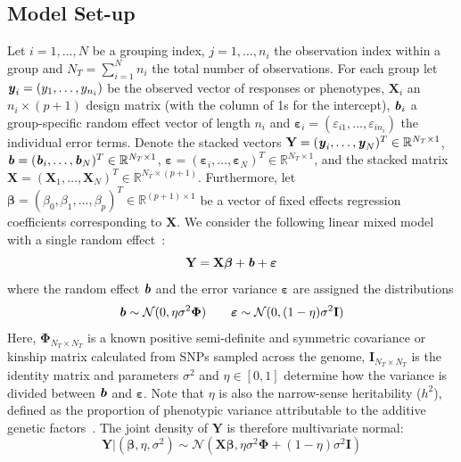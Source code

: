\documentclass[12pt,letter]{article}\usepackage[]{graphicx}\usepackage[]{color}
\newcommand{\by}{\textbf{\emph{y}}}
\newcommand{\bX}{\textbf{X}}
\newcommand{\bY}{\textbf{Y}}
\newcommand{\bb}{\textbf{\emph{b}}}
\newcommand{\bI}{\textbf{I}}
\newcommand{\be}{\boldsymbol{\varepsilon}}
\newcommand{\bbeta}{\boldsymbol{\beta}}
\newcommand{\bPhi}{\boldsymbol{\Phi}}
\begin{document}



\subsection{Model Set-up}

Let $i = 1, \ldots, N$ be a grouping index, $j = 1, \ldots, n_i$ the observation index within a group and $N_T = \sum_{i=1}^{N} n_i$ the total number of observations. For each group let \mbox{$\by_i = (y_1, \ldots, y_{n_i})$} be the observed vector of responses or phenotypes, $\bX_i$ an $n_i \times (p + 1)$ design matrix (with the column of 1s for the intercept), $\bb_i$ a group-specific random effect vector of length $n_i$ and \mbox{$\be_i = (\varepsilon_{i1}, \ldots, \varepsilon_{in_i})$} the individual error terms. Denote the stacked vectors $\bY = (\by_i, \ldots, \by_N)^T \in \mathbb{R}^{N_T \times 1}$, $\bb = (\bb_i, \ldots, \bb_N)^T \in \mathbb{R}^{N_T \times 1}$, \mbox{$\be = (\be_i, \ldots, \be_N)^T \in \mathbb{R}^{N_T \times 1}$}, and the stacked matrix \\\mbox{$\bX = (\bX_1, \ldots, \bX_N)^T \in \mathbb{R}^{N_T \times (p + 1)}$}. Furthermore, let $\bbeta = (\beta_0,\beta_1, \ldots, \beta_p)^T \in \mathbb{R}^{(p+1) \times 1}$ be a vector of fixed effects regression coefficients corresponding to $\bX$. We consider the following linear mixed model with a single random effect~\citep{pirinen2013efficient}:
\begin{equation}
	\bY = \bX \bbeta + \bb + \be
\end{equation}
where the random effect $\bb$ and the error variance $\be$ are assigned the distributions
\begin{equation}
	\bb \sim \mathcal{N}(0, \eta \sigma^2 \bPhi) \qquad \be \sim \mathcal{N}(0, (1-\eta)\sigma^2 \bI)
\end{equation}
Here, $\bPhi_{N_T \times N_T}$ is a known positive semi-definite and symmetric covariance or kinship matrix calculated from SNPs sampled across the genome,   $\bI_{N_T \times N_T}$ is the identity matrix and parameters $\sigma^2$ and $\eta \in [0,1]$ determine how the variance is divided between $\bb$ and $\be$. Note that $\eta$ is also the narrow-sense heritability ($h^2$), defined as the proportion of phenotypic variance attributable to the additive genetic factors~\citep{manolio2009finding}. The joint density of $\bY$ is therefore multivariate normal:
\begin{equation}
	\bY | (\bbeta, \eta, \sigma^2) \sim \mathcal{N}(\bX \bbeta, \eta \sigma^2 \bPhi + (1-\eta)\sigma^2 \bI) \label{eq:prinen}
\end{equation}
\end{document}
